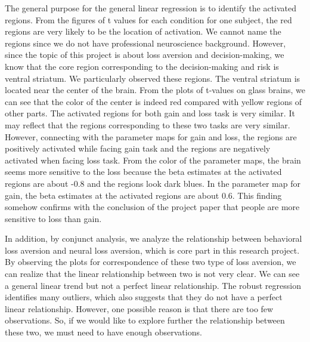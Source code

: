 \par \indent The general purpose for the general linear regression is to identify the activated regions. From the figures of t values for each condition for one subject, the red regions are very likely to be the location of activation. We cannot name the regions since we do not have professional neuroscience background. However, since the topic of this project is about loss aversion and decision-making, we know that the core region corresponding to the decision-making and risk is ventral striatum. We particularly observed these regions. The ventral striatum is located near the center of the brain. From the plots of t-values on glass brains, we can see that the color of the center is indeed red compared with yellow regions of other parts. The activated regions for both gain and loss task is very similar. It may reflect that the regions corresponding to these two tasks are very similar. However, connecting with the parameter maps for gain and loss, the regions are positively activated while facing gain task and the regions are negatively activated when facing loss task. From the color of the parameter maps, the brain seems more sensitive to the loss because the beta estimates at the activated regions are about -0.8 and the regions look dark blues. In the parameter map for gain, the beta estimates at the activated regions are about 0.6. This finding somehow confirms with the conclusion of the project paper that people are more sensitive to loss than gain. 

\par \indent In addition, by conjunct analysis, we analyze the relationship between behavioral loss aversion and neural loss aversion, which is core part in this research project. By observing the plots for correspondence of these two type of loss aversion, we can realize that the linear relationship between two is not very clear. We can see a general linear trend but not a perfect linear relationship. The robust regression identifies many outliers, which also suggests that they do not have a perfect linear relationship. However, one possible reason is that there are too few observations. So, if we would like to explore further the relationship between these two, we must need to have enough observations.